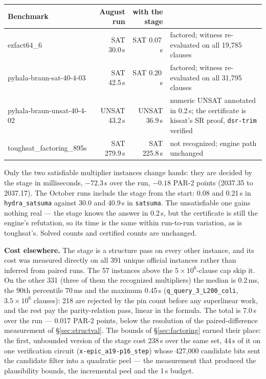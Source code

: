 \documentclass[10pt]{article}
\begin{document}
\begin{center}
\small
\begin{tabular}{@{}lrrp{6.1cm}@{}}
\toprule
Benchmark & August run & with the stage & \\
\midrule
ezfact64\_6 & SAT 30.0\,s & SAT 0.07\,s & factored; witness re-evaluated on all 19{,}785 clauses \\
pyhala-braun-sat-40-4-03 & SAT 42.5\,s & SAT 0.20\,s & factored; witness re-evaluated on all 31{,}795 clauses \\
pyhala-braun-unsat-40-4-02 & UNSAT 43.2\,s & UNSAT 36.9\,s & numeric UNSAT annotated in 0.2\,s; the certificate is kissat's SR proof, \texttt{dsr-trim} verified \\
toughsat\_factoring\_895s & SAT 279.9\,s & SAT 225.8\,s & not recognized; engine path unchanged \\
\bottomrule
\end{tabular}
\end{center}

Only the two satisfiable multiplier instances change hands: they are
decided by the stage in milliseconds, $-72.3$\,s over the run,
$-0.18$ PAR-2 points (2037.35 to 2037.17). The October runs include
the stage from the start: 0.08 and 0.21\,s in \texttt{hydra\_satsuma}
against 30.0 and 40.9\,s in \texttt{satsuma}. The unsatisfiable one
gains nothing real --- the stage knows the answer in 0.2\,s, but the
certificate is still the engine's refutation, so its time is the same
within run-to-run variation, as is toughsat's. Solved counts and
certified counts are unchanged.

\textbf{Cost elsewhere.} The stage is a structure pass on every other
instance, and its cost was measured directly on all 391 unique official
instances rather than inferred from paired runs. The 57 instances above
the $5\times 10^6$-clause cap skip it. On the other 331 (three of them
the recognized multipliers) the median is 0.2\,ms, the 90th percentile
70\,ms and the maximum 0.45\,s (\texttt{q\_query\_3\_L200\_coli},
$3.5\times 10^6$ clauses): 218 are rejected by the pin count before any
superlinear work, and the rest pay the parity-relation pass, linear in
the formula. The total is 7.0\,s over the run --- 0.017 PAR-2 points,
below the resolution of the paired-difference measurement of
\S\ref{sec:structval}. The bounds of \S\ref{sec:factoring} earned
their place: the first, unbounded version of the stage cost 238\,s over
the same set, 44\,s of it on one verification circuit
(\texttt{x-epic\_a19-p16\_step}) whose 427{,}000 candidate bits sent the
candidate filter into a quadratic peel --- the measurement that produced
the plausibility bounds, the incremental peel and the 1\,s budget.
\end{document}
